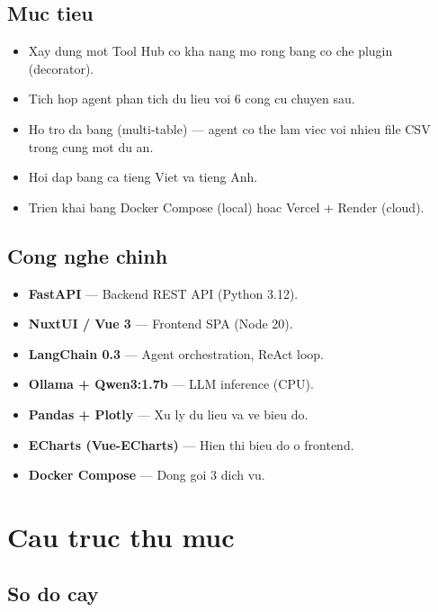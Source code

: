 \documentclass[12pt,a4paper]{article}
\begin{document}
\subsection{Muc tieu}

\begin{itemize}
  \item Xay dung mot Tool Hub co kha nang mo rong bang co che plugin (decorator).
  \item Tich hop agent phan tich du lieu voi 6 cong cu chuyen sau.
  \item Ho tro da bang (multi-table) --- agent co the lam viec voi nhieu file
        CSV trong cung mot du an.
  \item Hoi dap bang ca tieng Viet va tieng Anh.
  \item Trien khai bang Docker Compose (local) hoac Vercel + Render (cloud).
\end{itemize}

\subsection{Cong nghe chinh}

\begin{itemize}
  \item \textbf{FastAPI} --- Backend REST API (Python 3.12).
  \item \textbf{NuxtUI / Vue 3} --- Frontend SPA (Node 20).
  \item \textbf{LangChain 0.3} --- Agent orchestration, ReAct loop.
  \item \textbf{Ollama + Qwen3:1.7b} --- LLM inference (CPU).
  \item \textbf{Pandas + Plotly} --- Xu ly du lieu va ve bieu do.
  \item \textbf{ECharts (Vue-ECharts)} --- Hien thi bieu do o frontend.
  \item \textbf{Docker Compose} --- Dong goi 3 dich vu.
\end{itemize}

\section{Cau truc thu muc}

\subsection{So do cay}
\end{document}
